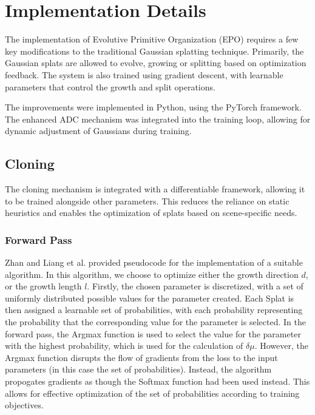\documentclass[11pt]{report}
\begin{document}
\section{Implementation Details}
The implementation of Evolutive Primitive Organization (EPO) requires a few key modifications to the traditional Gaussian splatting technique. Primarily, the Gaussian splats are allowed to evolve, growing or splitting based on optimization feedback. The system is also trained using gradient descent, with learnable parameters that control the growth and split operations.

The improvements were implemented in Python, using the PyTorch framework. The enhanced ADC mechanism was integrated into the training loop, allowing for dynamic adjustment of Gaussians during training.

\subsection{Cloning}

The cloning mechanism is integrated with a differentiable framework, allowing it to be trained alongside other parameters. This reduces the reliance on static heuristics and enables the optimization of splats based on scene-specific needs.

\subsubsection{Forward Pass}
Zhan and Liang et al. provided pseudocode for the implementation of a suitable algorithm. In this algorithm, we choose to optimize either the growth direction $d$, or the growth length $l$. Firstly, the chosen parameter is discretized, with a set of uniformly distributed possible values for the parameter created. Each Splat is then assigned a learnable set of probabilities, with each probability representing the probability that the corresponding value for the parameter is selected. In the forward pass, the Argmax function is used to select the value for the parameter with the highest probability, which is used for the calculation of $\delta \mu$. However, the Argmax function disrupts the flow of gradients from the loss to the input parameters (in this case the set of probabilities). Instead, the algorithm propogates gradients as though the Softmax function had been used instead. This allows for effective optimization of the set of probabilities according to training objectives.
\end{document}
